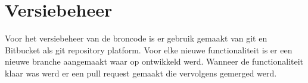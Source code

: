 \section{Versiebeheer}
Voor het versiebeheer van de broncode is er gebruik gemaakt van git en Bitbucket als git repository platform. 
Voor elke nieuwe functionaliteit is er een nieuwe branche aangemaakt waar op ontwikkeld werd.
Wanneer de functionaliteit klaar was werd er een pull request gemaakt die vervolgens gemerged werd.
